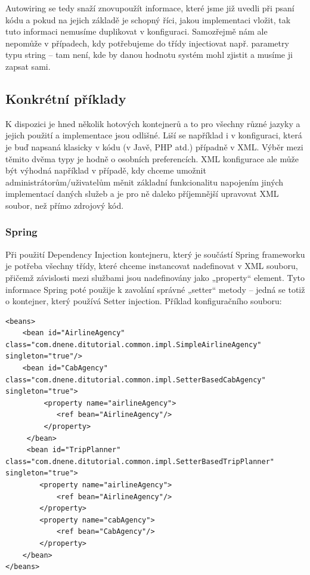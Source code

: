 \documentclass[a4paper,conference]{IEEEtran}
\begin{document}
Autowiring se tedy snaží znovupoužít informace, které jsme již uvedli při psaní kódu a pokud na jejich základě je schopný říci, jakou implementaci vložit, tak tuto informaci nemusíme duplikovat v konfiguraci. Samozřejmě nám ale nepomůže v případech, kdy potřebujeme do třídy injectiovat např. parametry typu string – tam není, kde by danou hodnotu systém mohl zjistit a musíme ji zapsat sami.

\subsection{Konkrétní příklady}

K dispozici je hned několik hotových kontejnerů a to pro všechny různé jazyky a jejich použití a implementace jsou odlišné. Liší se například i v konfiguraci, která je buď napsaná klasicky v kódu (v Javě, PHP atd.) případně v XML. Výběr mezi těmito dvěma typy je hodně o osobních preferencích. XML konfigurace ale může být výhodná například v případě, kdy chceme umožnit administrátorům/uživatelům měnit základní funkcionalitu napojením jiných implementací daných služeb a je pro ně daleko příjemnější upravovat XML soubor, než přímo zdrojový kód.

\subsubsection{Spring}

Při použití Dependency Injection kontejneru, který je součástí Spring frameworku je potřeba všechny třídy, které chceme instancovat nadefinovat v XML souboru, přičemž závislosti mezi službami jsou nadefinovány jako „property“ element. Tyto informace Spring poté použije k zavolání správné „setter“ metody – jedná se totiž o kontejner, který používá Setter injection. Příklad konfiguračního souboru:

\lstset{language=XML,caption=Konfigurační soubor Spring kontejneru,label=listing:XML}
\begin{lstlisting}
<beans>  
	<bean id="AirlineAgency" class="com.dnene.ditutorial.common.impl.SimpleAirlineAgency" singleton="true"/>  
	<bean id="CabAgency" class="com.dnene.ditutorial.common.impl.SetterBasedCabAgency" singleton="true">  
		 <property name="airlineAgency">	
	 		<ref bean="AirlineAgency"/>   
		 </property>  
	 </bean> 
	 <bean id="TripPlanner" class="com.dnene.ditutorial.common.impl.SetterBasedTripPlanner" singleton="true">   
	 	<property name="airlineAgency">	
			<ref bean="AirlineAgency"/>   
		</property>   
		<property name="cabAgency">	
			<ref bean="CabAgency"/>   
		</property>  
	</bean> 
</beans>
\end{lstlisting}
\end{document}
